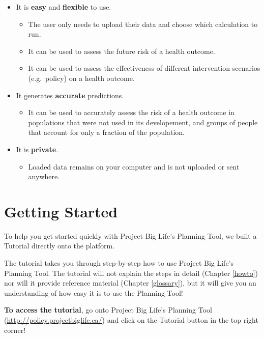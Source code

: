 \documentclass[]{book}
\providecommand{\tightlist}{%
  \setlength{\itemsep}{0pt}\setlength{\parskip}{0pt}}
\begin{document}
\begin{itemize}
\item
  It is \textbf{easy} and \textbf{flexible} to use.

  \begin{itemize}
  \tightlist
  \item
    The user only needs to upload their data and choose which
    calculation to run.
  \item
    It can be used to assess the future risk of a health outcome.
  \item
    It can be used to assess the effectiveness of different intervention
    scenarios (e.g.~policy) on a health outcome.
  \end{itemize}
\item
  It generates \textbf{accurate} predictions.

  \begin{itemize}
  \tightlist
  \item
    It can be used to accurately assess the risk of a health outcome in
    populations that were not used in its developement, and groups of
    people that account for only a fraction of the population.
  \end{itemize}
\item
  It is \textbf{private}.

  \begin{itemize}
  \tightlist
  \item
    Loaded data remains on your computer and is not uploaded or sent
    anywhere.
  \end{itemize}
\end{itemize}

\chapter{Getting Started}\label{getting-started}

To help you get started quickly with Project Big Life's Planning Tool,
we built a Tutorial directly onto the platform.

The tutorial takes you through step-by-step how to use Project Big
Life's Planning Tool. The tutorial will not explain the steps in detail
(Chapter \ref{howto}) nor will it provide reference material (Chapter
\ref{glossary}), but it will give you an understanding of how easy it is
to use the Planning Tool!

\textbf{To access the tutorial}, go onto Project Big Life's Planning
Tool (\url{http://policy.projectbiglife.ca/}) and click on the Tutorial
button in the top right corner!
\end{document}
